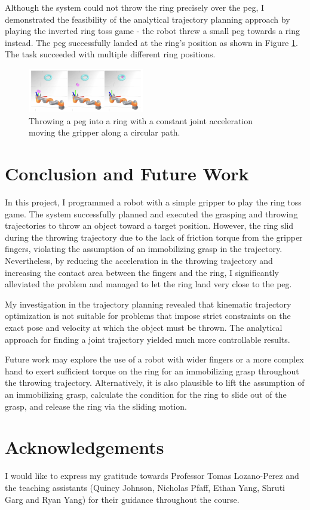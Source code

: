 \documentclass[conference]{IEEEtran}
\begin{document}
Although the system could not throw the ring precisely over the peg, I demonstrated the feasibility of the analytical trajectory planning approach by playing the inverted ring toss game - the robot threw a small peg towards a ring instead. The peg successfully landed at the ring's position as shown in Figure \ref{fig:throw_peg}. The task succeeded with multiple different ring positions.

\begin{figure}[ht]
\centering
\includegraphics[width=0.45\textwidth]{images/throw_peg.png}
\caption{Throwing a peg into a ring with a constant joint acceleration moving the gripper along a circular path.}
\label{fig:throw_peg}
\end{figure}

\section{Conclusion and Future Work}
In this project, I programmed a robot with a simple gripper to play the ring toss game. The system successfully planned and executed the grasping and throwing trajectories to throw an object toward a target position. However, the ring slid during the throwing trajectory due to the lack of friction torque from the gripper fingers, violating the assumption of an immobilizing grasp in the trajectory. Nevertheless, by reducing the acceleration in the throwing trajectory and increasing the contact area between the fingers and the ring, I significantly alleviated the problem and managed to let the ring land very close to the peg.

My investigation in the trajectory planning revealed that kinematic trajectory optimization is not suitable for problems that impose strict constraints on the exact pose and velocity at which the object must be thrown. The analytical approach for finding a joint trajectory yielded much more controllable results.

Future work may explore the use of a robot with wider fingers or a more complex hand to exert sufficient torque on the ring for an immobilizing grasp throughout the throwing trajectory. Alternatively, it is also plausible to lift the assumption of an immobilizing grasp, calculate the condition for the ring to slide out of the grasp, and release the ring via the sliding motion.

\section{Acknowledgements}
I would like to express my gratitude towards Professor Tomas Lozano-Perez and the teaching assistants (Quincy Johnson, Nicholas Pfaff, Ethan Yang, Shruti Garg and Ryan Yang) for their guidance throughout the course.



\end{document}
